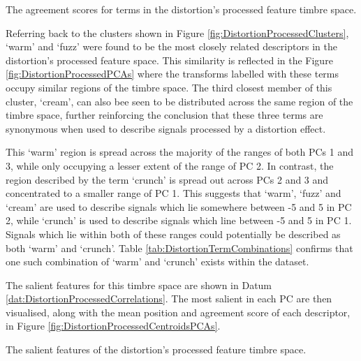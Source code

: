 			\begin{table}[h!]
				\centering
				
				\caption{The agreement scores for terms in the 
					 distortion's processed feature timbre space.}
				\label{tab:DistortionProcessedAgreements}
			\end{table}

			Referring back to the clusters shown in Figure \ref{fig:DistortionProcessedClusters}, `warm' and
			`fuzz' were found to be the most closely related descriptors in the distortion's processed feature
			space. This similarity is reflected in the Figure \ref{fig:DistortionProcessedPCAs} where the
			transforms labelled with these terms occupy similar regions of the timbre space. The third closest
			member of this cluster, `cream', can also bee seen to be distributed across the same region of the
			timbre space, further reinforcing the conclusion that these three terms are synonymous when used to
			describe signals processed by a distortion effect.

			This `warm' region is spread across the majority of the ranges of both PCs 1 and 3, while only
			occupying a lesser extent of the range of PC 2. In contrast, the region described by the term
			`crunch' is spread out across PCs 2 and 3 and concentrated to a smaller range of PC 1. This
			suggests that `warm', `fuzz' and `cream' are used to describe signals which lie somewhere between
			-5 and 5 in PC 2, while `crunch' is used to describe signals which line between -5 and 5 in PC 1.
			Signals which lie within both of these ranges could potentially be described as both `warm' and
			`crunch'. Table \ref{tab:DistortionTermCombinations} confirms that one such combination of
			`warm' and `crunch' exists within the dataset.

			The salient features for this timbre space are shown in Datum
			\ref{dat:DistortionProcessedCorrelations}. The most salient in each PC are then visualised, along
			with the mean position and agreement score of each descriptor, in Figure
			\ref{fig:DistortionProcessedCentroidsPCAs}. 

			\begin{datum}[h!]
				\centering
				\begin{minipage}{0.9\textwidth}
					
				\end{minipage}
				\caption{The salient features of the distortion's 
					 processed feature timbre space.}
				\label{dat:DistortionProcessedCorrelations}
			\end{datum}

